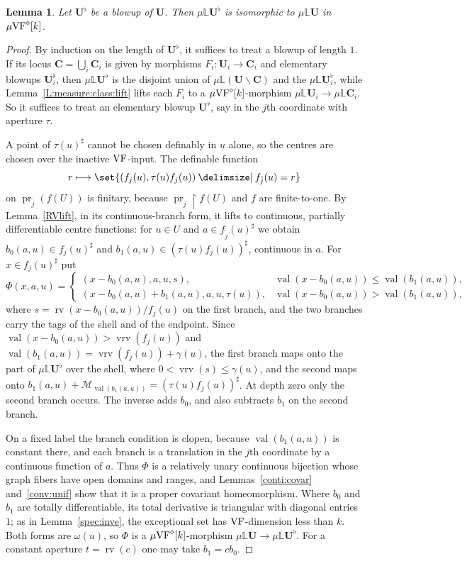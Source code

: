 \documentclass[12pt]{amsart}
\theoremstyle{plain}
\newtheorem{lem}[thm]{Lemma}
\theoremstyle{definition}
\theoremstyle{remark}
\numberwithin{equation}{section}
\theoremstyle{plain}
\newcommand{\VF}{\textup{VF}}
\newcommand{\MM}{\mdl M}
\DeclareMathOperator{\pr}{pr}
\newcommand{\0}{\emptyset}
\newcommand{\mdl}[1]{\mathcal{#1}}  %
\newcommand{\bb}[1]{\mathbb{#1}}
\newcommand{\rest}{\upharpoonright}
\newcommand{\fun}{\longrightarrow}
\newcommand{\efun}{\longmapsto}
\newcommand{\mi}{\smallsetminus}
\providecommand\given{}
\newcommand\SetSymbol[1][]{%
\nonscript \: #1 \vert
\allowbreak
\nonscript\:
\mathopen{}}
\renewcommand\given{\SetSymbol[\delimsize]}
\newcommand{\mVF}{{\mu}{\VF}}
\newcommand{\mL}{{\mu}{\bb L}}
\DeclareMathOperator{\rv}{rv}
\DeclareMathOperator{\vv}{val}
\DeclareMathOperator{\vrv}{vrv}
\begin{document}
\begin{lem}\label{blowup:same:RV:coa}
Let $\bm U^{\flat}$ be a blowup of $\bm U$. Then $\mL \bm U^{\flat}$ is isomorphic to $\mL \bm U$ in $\mVF^{\diamond}[k]$.
\end{lem}
\begin{proof}
By induction on the length of $\bm U^{\flat}$, it suffices to treat a blowup of length $1$. If its locus $\bm C = \bigcup_i \bm C_i$ is given by morphisms $F_i : \bm U_i \fun \bm C_i$ and elementary blowups $\bm U_i^\flat$, then $\mL \bm U^\flat$ is the disjoint union of $\mL(\bm U \mi \bm C)$ and the $\mL \bm U_i^\flat$, while Lemma~\ref{L:measure:class:lift} lifts each $F_i$ to a $\mVF^\diamond[k]$-morphism $\mL \bm U_i \fun \mL \bm C_i$. So it suffices to treat an elementary blowup $\bm U^\flat$, say in the $j$th coordinate with aperture $\tau$.

A point of $\tau(u)^\sharp$ cannot be chosen definably in $u$ alone, so the centres are chosen over the inactive $\VF$-input. The definable function
\[
r \efun \set{(f_j(u), \tau(u) f_j(u)) \given f_{\tilde j}(u) = r}
\]
on $\pr_{\tilde j}(f(U))$ is finitary, because $\pr_{\tilde j} \rest f(U)$ and $f$ are finite-to-one. By Lemma~\ref{RVlift}, in its continuous-branch form, it lifts to continuous, partially differentiable centre functions: for $u \in U$ and $a \in f_{\tilde j}(u)^\sharp$ we obtain $b_0(a, u) \in f_j(u)^\sharp$ and $b_1(a, u) \in (\tau(u) f_j(u))^\sharp$, continuous in $a$. For $x \in f_j(u)^\sharp$ put
\[
\Phi(x, a, u) =
\begin{cases}
(x - b_0(a, u), a, u, s), & \vv(x - b_0(a, u)) \leq \vv(b_1(a, u)),\\
(x - b_0(a, u) + b_1(a, u), a, u, \tau(u)), & \vv(x - b_0(a, u)) > \vv(b_1(a, u)),
\end{cases}
\]
where $s = \rv(x - b_0(a, u)) / f_j(u)$ on the first branch, and the two branches carry the tags of the shell and of the endpoint. Since $\vv(x - b_0(a, u)) > \vrv(f_j(u))$ and $\vv(b_1(a, u)) = \vrv(f_j(u)) + \gamma(u)$, the first branch maps onto the part of $\mL \bm U^\flat$ over the shell, where $0 < \vrv(s) \leq \gamma(u)$, and the second maps onto $b_1(a, u) + \MM_{\vv(b_1(a, u))} = (\tau(u) f_j(u))^\sharp$. At depth zero only the second branch occurs. The inverse adds $b_0$, and also subtracts $b_1$ on the second branch.

On a fixed label the branch condition is clopen, because $\vv(b_1(a, u))$ is constant there, and each branch is a translation in the $j$th coordinate by a continuous function of $a$. Thus $\Phi$ is a relatively unary continuous bijection whose graph fibers have open domains and ranges, and Lemmas~\ref{conti:covar} and~\ref{conv:unif} show that it is a proper covariant homeomorphism. Where $b_0$ and $b_1$ are totally differentiable, its total derivative is triangular with diagonal entries $1$; as in Lemma~\ref{spec:inve}, the exceptional set has $\VF$-dimension less than $k$. Both forms are $\omega(u)$, so $\Phi$ is a $\mVF^\diamond[k]$-morphism $\mL \bm U \fun \mL \bm U^\flat$. For a constant aperture $t = \rv(c)$ one may take $b_1 = c b_0$.


\end{proof}
\end{document}
